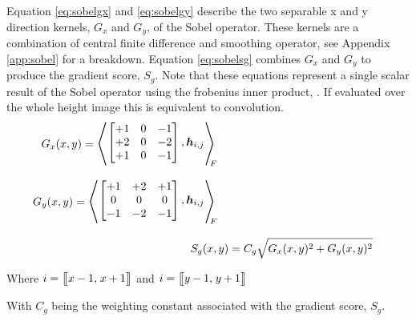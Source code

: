         \newpage
        \noindent
        Equation \ref{eq:sobelgx} and \ref{eq:sobelgy} describe the two separable x and y direction kernels, \(G_x\) and \(G_y\),
        of the Sobel operator. These kernels are a combination of central finite difference and smoothing operator, see Appendix \ref{app:sobel} 
        for a breakdown. Equation \ref{eq:sobelsg} combines \(G_x\) and \(G_y\) to produce the gradient score, \(S_g\). Note that these equations represent
        a single scalar result of the Sobel operator using the frobenius inner product, \cite{horn2012matrix}. If evaluated over the whole height image this is equivalent
        to convolution.
        \begin{align}
            \begin{split} \label{eq:sobelgx}
                G_x(x,y) &= 
                        \sbox0{$
                        \begin{bmatrix}
                            +1 & 0 & -1\\
                            +2 & 0 & -2\\
                            +1 & 0 & -1
                        \end{bmatrix}
                        ,\boldsymbol{h}_{i,j}
                        $}
                        \mathopen{\resizebox{1.2\width}{1.1\ht0}{$\Bigg\langle$}}
                        \raisebox{0.08\ht0}{\usebox{0}}
                        \mathclose{\resizebox{1.2\width}{1.1\ht0}{$\Bigg\rangle$}}_{\mkern-10mu F}
            \end{split}\\[0.3cm]
            \begin{split} \label{eq:sobelgy}
                G_y(x,y) &= 
                        \sbox0{$
                        \begin{bmatrix}
                            +1 & +2 & +1\\
                            0 & 0 & 0\\
                            -1 & -2 & -1
                        \end{bmatrix}
                        ,\boldsymbol{h}_{i,j}
                        $}
                        \mathopen{\resizebox{1.2\width}{1.1\ht0}{$\Bigg\langle$}}
                        \raisebox{0.08\ht0}{\usebox{0}}
                        \mathclose{\resizebox{1.2\width}{1.1\ht0}{$\Bigg\rangle$}}_{\mkern-10mu F}
            \end{split}\\[0.3cm]
            S_g(x,y) &= C_g\sqrt{G_x(x,y)^2 + G_y(x,y)^2} \label{eq:sobelsg}
        \end{align}
        \begin{center}
            Where \(i = \big[\mkern-4.7mu\big[x-1,\mkern2mu x+1\big]\mkern-4.7mu\big]\) and \(i = \big[\mkern-4.7mu\big[y-1,\mkern2mu y+1\big]\mkern-4.7mu\big]\)
        \end{center}
        \noindent
        With \(C_g\) being the weighting constant associated with the gradient score, \(S_g\).
        

